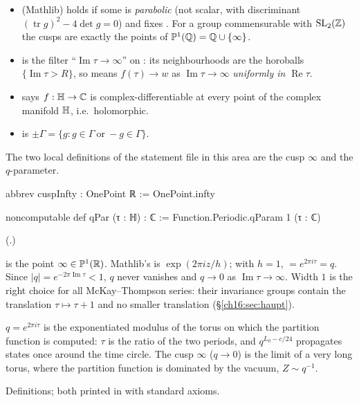 \begin{itemize}
  encodes ``infinite''.  So $H\cap K$ has finite index in both $H$ and $K$.
\item {} (Mathlib) holds if some  is \emph{parabolic} (not scalar, with discriminant
  $(\operatorname{tr}g)^2-4\det g=0$) and fixes .  For a group commensurable with $\mathrm{SL}_2(\mathbb{Z})$ the cusps are
  exactly the points of $\mathbb{P}^1({\mathbb{Q}})={\mathbb{Q}}\cup\{\infty\}$.
\item {} is the filter ``$\operatorname{Im}\tau\to\infty$'' on : its neighbourhoods are the
  horoballs $\{\operatorname{Im}\tau>R\}$, so  means $f(\tau)\to w$ as
  $\operatorname{Im}\tau\to\infty$ \emph{uniformly in $\operatorname{Re}\tau$}.
\item {} says $f:\mathbb{H}\to{\mathbb{C}}$ is complex-differentiable at every point of the
  complex manifold $\mathbb{H}$, i.e.\ holomorphic.
\item {} is $\pm\Gamma=\{g: g\in\Gamma\ \text{or}\ -g\in\Gamma\}$.
\end{itemize}
The two local definitions of the statement file in this area are the cusp $\infty$ and the $q$-parameter.
\begin{leancode}
abbrev cuspInfty : OnePoint ℝ := OnePoint.infty

noncomputable def qPar (τ : ℍ) : ℂ := Function.Periodic.qParam 1 (τ : ℂ)
\end{leancode}
(.)
\begin{dictionary}
 is the point $\infty\in\mathbb{P}^1(\mathbb{R})$.  Mathlib's  is
$\exp(2\pi i z/h)$; with $h=1$,  $=e^{2\pi i\tau}=q$.  Since $|q|=e^{-2\pi\operatorname{Im}\tau}<1$, $q$
never vanishes and $q\to0$ as $\operatorname{Im}\tau\to\infty$.  Width $1$ is the right choice for all
McKay--Thompson series: their invariance groups contain the translation $\tau\mapsto\tau+1$ and no smaller translation
(\S\ref{ch16:sec:haupt}).
\end{dictionary}
\begin{physics}
$q=e^{2\pi i\tau}$ is the exponentiated modulus of the torus on which the partition function is computed: $\tau$ is
the ratio of the two periods, and $q^{L_0-c/24}$ propagates states once around the time circle.  The cusp $\infty$
($q\to0$) is the limit of a very long torus, where the partition function is dominated by the vacuum, $Z\sim q^{-1}$.
\end{physics}
\begin{status}
Definitions; both printed in  with standard axioms.
\end{status}

